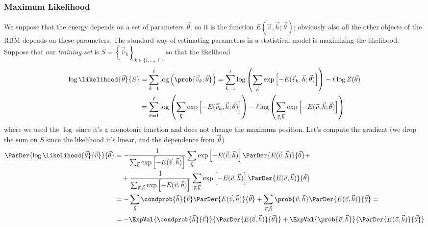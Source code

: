   \subsubsection{Maximum Likelihood}
  We suppose that the energy depends on a set of parameters \(\vec{\theta}\), so it is the function
  \(E(\vec{v}, \vec{h};\vec{\theta})\); obviously also all the other objects of the RBM depends on these parameters. The standard way of estimating parameters in a statistical
  model is maximizing the likelihood. Suppose that our \emph{training set} is 
  \(S = \left\{\vec{\bar{v}}_k\right\}_{k \in \{1,\dots,\ell\}}\) so that the likelihood
  \begin{align*}
    \log\likelihood{\vec{\theta}}{S}
      &= \sum_{k=1}^\ell \log\left(\prob{\vec{\bar{v}}_k;\vec{\theta}}\right)
       = \sum_{k=1}^\ell \log\left(\sum_{\vec{h}} 
                                      \exp\left[-E(\vec{\bar{v}}_k,\vec{h};\vec{\theta})\right]\right)
         -\ell \log{Z(\vec{\theta})} \\
      &= \sum_{k=1}^\ell \log\left(\sum_{\vec{h}} 
                                      \exp\left[-E(\vec{\bar{v}}_k,\vec{h};\vec{\theta})\right]\right)
         -\ell \log\left(\sum_{\vec{v},\vec{h}} 
                                 \exp\left[-E(\vec{v},\vec{h};\vec{\theta})\right]\right)
   \end{align*}
   where we used the \(\log\) since it's a monotonic function and does not change the maximum position.
  Let's compute the gradient (we drop the sum on \(S\) since the likelihood it's linear, and the dependence from \(\vec{\theta}\))
  \begin{align*} \displaystyle
    \ParDer{\log\likelihood{\vec{\theta}}{\vec{\bar{v}}}}{\vec{\theta}}
      &= -\frac{1}{\sum_{\vec{h}}\exp\left[-E(\vec{\bar{v}},\vec{h})\right]}
          \sum_{\vec{h}}\exp\left[-E(\vec{\bar{v}},\vec{h})\right]
          \ParDer{E(\vec{\bar{v}},\vec{h})}{\vec{\theta}}+ \\
      &\quad +\frac{1}{\sum_{\vec{v},\vec{h}}\exp\left[-E(\vec{v},\vec{h})\right]}
          \sum_{\vec{v},\vec{h}}\exp\left[-E(\vec{v},\vec{h})\right]
          \ParDer{E(\vec{v},\vec{h})}{\vec{\theta}} \\
      &= -\sum_{\vec{h}}\condprob{\vec{h}}{\vec{\bar{v}}}
        \ParDer{E(\vec{\bar{v}},\vec{h})}{\vec{\theta}} +
        \sum_{\vec{v},\vec{h}}\prob{\vec{v},\vec{h}}
        \ParDer{E(\vec{v},\vec{h})}{\vec{\theta}} =\\
      &= -\ExpVal{\condprob{\vec{h}}{\vec{\bar{v}}}}{\ParDer{E(\vec{\bar{v}},\vec{h})}{\vec{\theta}}}
         +\ExpVal{\prob{\vec{v},\vec{h}}}{\ParDer{E(\vec{v},\vec{h})}{\vec{\theta}}}
  \end{align*}
  
